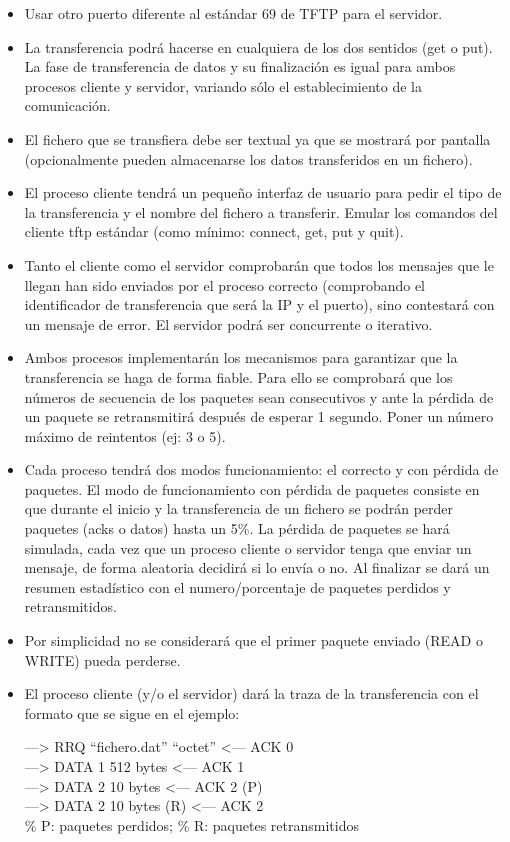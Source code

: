 \documentclass{article}
\begin{document}
\begin{itemize}
\item Usar otro puerto diferente al estándar 69 de TFTP para el servidor.
\item La transferencia podrá hacerse en cualquiera de los dos sentidos (get o put). La fase de transferencia de datos y su finalización es igual para ambos procesos cliente y servidor,
variando sólo el establecimiento de la comunicación.
\item El fichero que se transfiera debe ser textual ya que se mostrará por pantalla
(opcionalmente pueden almacenarse los datos transferidos en un fichero).
\item El proceso cliente tendrá un pequeño interfaz de usuario para pedir el tipo de la
transferencia y el nombre del fichero a transferir. Emular los comandos del cliente tftp
estándar (como mínimo: connect, get, put y quit).
\item Tanto el cliente como el servidor comprobarán que todos los mensajes que le llegan han
sido enviados por el proceso correcto (comprobando el identificador de transferencia que
será la IP y el puerto), sino contestará con un mensaje de error. El servidor podrá ser
concurrente o iterativo.
\item Ambos procesos implementarán los mecanismos para garantizar que la transferencia se
haga de forma fiable. Para ello se comprobará que los números de secuencia de los
paquetes sean consecutivos y ante la pérdida de un paquete se retransmitirá después de
esperar 1 segundo. Poner un número máximo de reintentos (ej: 3 o 5).
\item Cada proceso tendrá dos modos funcionamiento: el correcto y con pérdida de paquetes. El
modo de funcionamiento con pérdida de paquetes consiste en que durante el inicio y la
transferencia de un fichero se podrán perder paquetes (acks o datos) hasta un 5\%. La
pérdida de paquetes se hará simulada, cada vez que un proceso cliente o servidor tenga
que enviar un mensaje, de forma aleatoria decidirá si lo envía o no. Al finalizar se dará un
resumen estadístico con el numero/porcentaje de paquetes perdidos y retransmitidos.
\item Por simplicidad no se considerará que el primer paquete enviado (READ o WRITE) pueda
perderse.
\item El proceso cliente (y/o el servidor) dará la traza de la transferencia con el formato que se sigue en el ejemplo:

---> RRQ “fichero.dat” “octet” 		<--- ACK 0\\
---> DATA 1 512 bytes 				<--- ACK 1\\
---> DATA 2 10 bytes				<--- ACK 2 (P)\\
---> DATA 2 10 bytes (R)			<--- ACK 2\\
\% P: paquetes perdidos; \% R: paquetes retransmitidos
\end{itemize}
\end{document}
